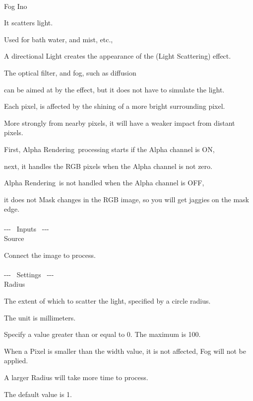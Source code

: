 \documentclass[a4paper,12pt]{article}
\begin{document}
\thispagestyle{empty}

\Large
\noindent \\
Fog Ino\medskip
\par
\normalsize
It scatters light.\\
\par
Used for bath water, and mist, etc.,\par
A directional Light creates the appearance of the (Light Scattering) effect.\par
The optical filter, and fog, such as diffusion\par
can be aimed at by the effect, but it does not have to simulate the light.\\
\par
Each pixel, is affected by the shining of a more bright surrounding pixel.\par
More strongly from nearby pixels, it will have a weaker impact from distant pixels.\\
\par
First, \textquotedbl Alpha Rendering\textquotedbl \ processing starts if the Alpha channel is ON,\par
next, it handles the RGB pixels when the Alpha channel is not zero.\\
\par
\textquotedbl Alpha Rendering\textquotedbl \ is not handled when the Alpha channel is OFF,\par
it does not Mask changes in the RGB image, so you will get jaggies on the mask edge.\\
\\
-{-}- \ Inputs \ -{-}-\\
Source\par
Connect the image to process.\\
\\
-{-}- \ Settings \ -{-}-\\
Radius\par
The extent of which to scatter the light, specified by a circle radius.\par
The unit is millimeters.\par
Specify a value greater than or equal to 0. The maximum is 100.\par
When a Pixel is smaller than the width value, it is not affected, Fog will not be applied.\par
A larger Radius will take more time to process.\par
The default value is 1.\\
\\
\end{document}
